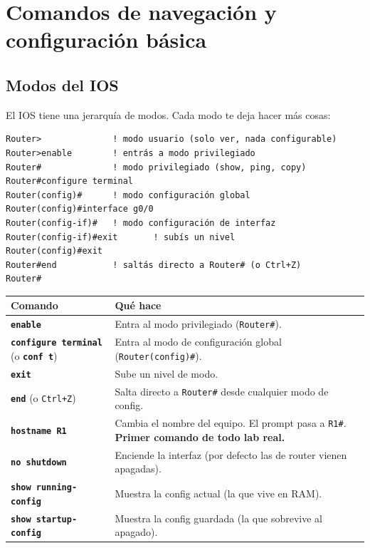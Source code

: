 \documentclass[11pt,a4paper]{report}
\newcommand{\cmd}[1]{\texttt{\textbf{#1}}}
\newcommand{\prompt}[1]{\texttt{#1}}
\begin{document}
\chapter{Comandos de navegación y configuración básica}

\section{Modos del IOS}

El IOS tiene una jerarquía de modos. Cada modo te deja hacer más cosas:

\begin{lstlisting}
Router>              ! modo usuario (solo ver, nada configurable)
Router>enable        ! entrás a modo privilegiado
Router#              ! modo privilegiado (show, ping, copy)
Router#configure terminal
Router(config)#      ! modo configuración global
Router(config)#interface g0/0
Router(config-if)#   ! modo configuración de interfaz
Router(config-if)#exit       ! subís un nivel
Router(config)#exit
Router#end           ! saltás directo a Router# (o Ctrl+Z)
Router#
\end{lstlisting}

\begin{longtable}{@{}p{6cm}p{9.5cm}@{}}
\toprule
\textbf{Comando} & \textbf{Qué hace} \\
\midrule
\endhead
\cmd{enable} & Entra al modo privilegiado (\prompt{Router\#}). \\
\addlinespace
\cmd{configure terminal} (o \cmd{conf t}) & Entra al modo de configuración global (\prompt{Router(config)\#}). \\
\addlinespace
\cmd{exit} & Sube un nivel de modo. \\
\addlinespace
\cmd{end} (o \texttt{Ctrl+Z}) & Salta directo a \prompt{Router\#} desde cualquier modo de config. \\
\addlinespace
\cmd{hostname R1} & Cambia el nombre del equipo. El prompt pasa a \prompt{R1\#}. \textbf{Primer comando de todo lab real.} \\
\addlinespace
\cmd{no shutdown} & Enciende la interfaz (por defecto las de router vienen apagadas). \\
\addlinespace
\cmd{show running-config} & Muestra la config actual (la que vive en RAM). \\
\addlinespace
\cmd{show startup-config} & Muestra la config guardada (la que sobrevive al apagado). \\
\bottomrule
\end{longtable}
\end{document}
